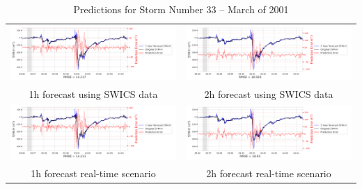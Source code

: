 \documentclass[draft,sw]{agutexSI2019}
\begin{document}
\begin{table}
\centering
\begin{tabular}{cc}
\includegraphics[width=0.49\linewidth]{paper_plots_shade/1h_swics/1h_swics_storm_33.png}
&
\includegraphics[width=0.49\linewidth]{paper_plots_shade/2h_swics/2h_swics_storm_33.png}
\\
1h forecast using SWICS data & 2h forecast using SWICS data
\vspace*{12pt}
\\
\includegraphics[width=0.49\linewidth]{paper_plots_shade/1h_rt/1h_rt_storm_33.png}
&
\includegraphics[width=0.49\linewidth]{paper_plots_shade/2h_rt/2h_rt_storm_33.png}
\\
1h forecast real-time scenario & 2h forecast real-time scenario 
\vspace*{12pt}
\\
\end{tabular}
\caption{Predictions for Storm Number 33 -- March of 2001}
\label{storm-33}
\end{table}
\end{document}

